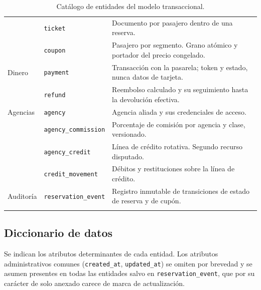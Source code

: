 \documentclass[10pt,letterpaper]{article}
\begin{document}
\begin{longtable}{@{}L{2.6cm} L{3.6cm} L{9.6cm}@{}}
 & \texttt{ticket} & Documento por pasajero dentro de una reserva. \\
 & \texttt{coupon} & Pasajero por segmento. Grano atómico y portador del precio congelado. \\
\midrule
Dinero
 & \texttt{payment} & Transacción con la pasarela; token y estado, nunca datos de tarjeta. \\
 & \texttt{refund} & Reembolso calculado y su seguimiento hasta la devolución efectiva. \\
\midrule
Agencias
 & \texttt{agency} & Agencia aliada y sus credenciales de acceso. \\
 & \texttt{agency\_commission} & Porcentaje de comisión por agencia y clase, versionado. \\
 & \texttt{agency\_credit} & Línea de crédito rotativa. Segundo recurso disputado. \\
 & \texttt{credit\_movement} & Débitos y restituciones sobre la línea de crédito. \\
\midrule
Auditoría & \texttt{reservation\_event} & Registro inmutable de transiciones de estado de reserva y de cupón. \\
\bottomrule
\caption{Catálogo de entidades del modelo transaccional.}
\end{longtable}

\subsection{Diccionario de datos}
Se indican los atributos determinantes de cada entidad. Los atributos administrativos comunes (\texttt{created\_at}, \texttt{updated\_at}) se omiten por brevedad y se asumen presentes en todas las entidades salvo en \texttt{reservation\_event}, que por su carácter de solo anexado carece de marca de actualización.
\end{document}
